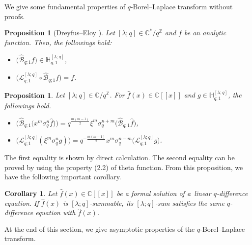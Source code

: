 \documentclass[pdftex]{sigma}
\numberwithin{equation}{section}
\newtheorem{Corollary}[Theorem]{Corollary}
\newtheorem{Proposition}[Theorem]{Proposition}
\begin{document}
We give some fundamental properties of $q$-Borel--Laplace transform without proofs.
\begin{Proposition}[Dreyfus--Eloy {\cite[Section~1]{DreyfusEloy2016}}] Let $[\lambda;q]\in\mathbb{C}^*/q^\mathbb{Z}$ and $f$ be an analytic function. Then, the followings hold:
\begin{itemize}\itemsep=0pt
\item $\big(\hat{\mathcal{B}}_{q;1}f\big)\in\mathbb{H}_{q;1}^{[\lambda;q]}$,
\item $\big(\mathcal{L}_{q;1}^{[\lambda;q]}\circ\hat{\mathcal{B}}_{q;1}f\big)=f$.
\end{itemize}
\end{Proposition}
\begin{Proposition}\label{prop_borel2} Let $[\lambda;q]\in\mathbb{C}/q^\mathbb{Z}$. For $\hat{f}(x)\in\mathbb{C}[[x]]$ and $g\in\mathbb{H}_{q;1}^{[\lambda;q]}$, the followings hold.
\begin{itemize}\itemsep=0pt
\item $\big(\hat{\mathcal{B}}_{q;1}\big(x^m\sigma_q^n\hat{f}\big)\big)=q^{\frac{m(m-1)}{2}}\xi^m\sigma_q^{n+m}\big(\hat{\mathcal{B}}_{q;1}\hat{f}\big)$,
\item $\big(\mathcal{L}_{q;1}^{[\lambda;q]}(\xi^m\sigma_q^ng)\big)=q^{-\frac{m(m-1)}{2}}x^m\sigma_q^{n-m}\big(\mathcal{L}_{q;1}^{[\lambda;q]}g\big)$.
\end{itemize}
\end{Proposition}
The first equality is shown by direct calculation. The second equality can be proved by using the property (2.2) of theta function. From this proposition, we have the following important corollary.
\begin{Corollary}\label{cor_q-diff}
Let $\hat{f}(x)\in\mathbb{C}[[x]]$ be a formal solution of a~linear $q$-difference equation. If $\hat{f}(x)$ is $[\lambda;q]$-summable, its $[\lambda;q]$-sum satisfies the same $q$-difference equation with $\hat{f}(x)$.
\end{Corollary}

At the end of this section, we give asymptotic properties of the $q$-Borel--Laplace transform.
\end{document}
